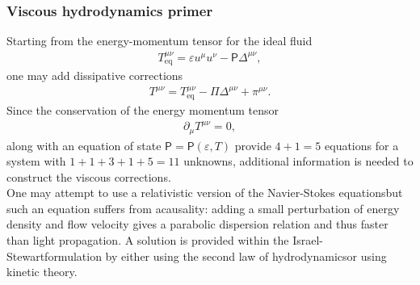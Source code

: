 \subsubsection{Viscous hydrodynamics primer}
Starting from the energy-momentum tensor for the ideal fluid
\begin{align*}
    T^{\mu\nu}_\text{eq}=\varepsilon u^\mu u^\nu-\textsf{P}\Delta^{\mu\nu},
\end{align*}
one may add dissipative corrections
\begin{align*}
    T^{\mu\nu}=T^{\mu\nu}_\text{eq}-\Pi\Delta^{\mu\nu}+\pi^{\mu\nu}.
\end{align*}
Since the conservation of the energy momentum tensor
\begin{align*}
    \partial_\mu T^{\mu\nu}=0,
\end{align*}
along with an equation of state $\textsf{P}=\textsf{P}(\varepsilon,T)$ provide $4+1=5$ equations for a system with $1+1+3+1+5=11$ unknowns, additional information is needed to construct the viscous corrections.\\

One may attempt to use a relativistic version of the Navier-Stokes equationsbut such an equation suffers from acausality: adding a small perturbation of energy density and flow velocity gives a parabolic dispersion relation and thus faster than light propagation. A solution is provided within the Israel-Stewartformulation by either using the second law of hydrodynamicsor using kinetic theory. \\

